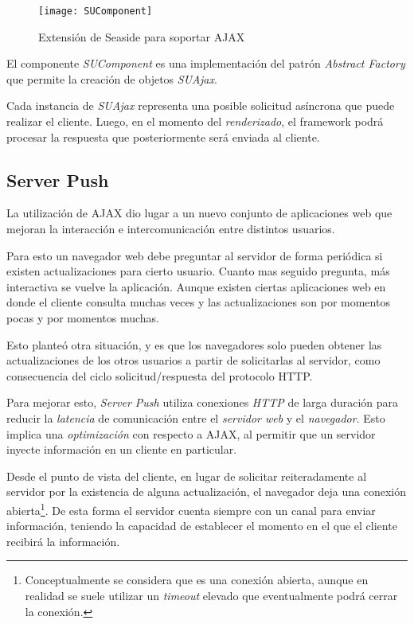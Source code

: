 \begin{figure}[ht!]
\centering
\texttt{[image: SUComponent]}
\caption{Extensión de Seaside para soportar AJAX}
\label{SUComponent}
\end{figure}

El componente \emph{SUComponent} es una implementación del patrón \emph{Abstract Factory}\cite{Gamma95} que permite la creación de objetos \emph{SUAjax}.

Cada instancia de \emph{SUAjax} representa una posible solicitud asíncrona que puede realizar el cliente. Luego, en el momento del \emph{renderizado}, el framework podrá procesar la respuesta que posteriormente será enviada al cliente.


\subsection{Server Push}

La utilización de AJAX dio lugar a un nuevo conjunto de aplicaciones web que mejoran la interacción e intercomunicación entre distintos usuarios.

Para esto un navegador web debe preguntar al servidor de forma periódica si existen actualizaciones para cierto usuario. Cuanto mas seguido pregunta, más interactiva se vuelve la aplicación. Aunque existen ciertas aplicaciones web en donde el cliente consulta muchas veces y las actualizaciones son por momentos pocas y por momentos muchas.

Esto planteó otra situación, y es que los navegadores solo pueden obtener las actualizaciones de los otros usuarios a partir de solicitarlas al servidor, como consecuencia del ciclo solicitud/respuesta del protocolo HTTP.

Para mejorar esto, \emph{Server Push} utiliza conexiones \emph{HTTP} de larga duración para reducir la \emph{latencia} de comunicación entre el \emph{servidor web} y el \emph{navegador}. Esto implica una \emph{optimización} con respecto a AJAX, al permitir que un servidor inyecte información en un cliente en particular.

Desde el punto de vista del cliente, en lugar de solicitar reiteradamente al servidor por la existencia de alguna actualización, el navegador deja una conexión abierta\footnote{Conceptualmente se considera que es una conexión abierta, aunque en realidad se suele utilizar un \emph{timeout} elevado que eventualmente podrá cerrar la conexión.}. De esta forma el servidor cuenta siempre con un canal para enviar información, teniendo la capacidad de establecer el momento en el que el cliente recibirá la información.

